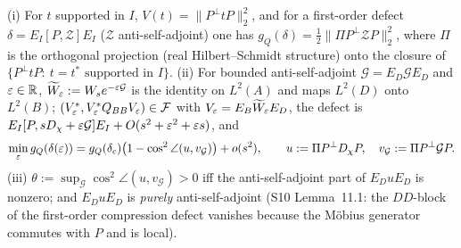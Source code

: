 \documentclass[11pt,a4paper]{article}
\begin{document}
\begin{lemma}\label{lem:orbit}
(i) For \(t\) supported in \(I\), \(V(t)=\|P^\perp tP\|_2^2\), and for a first-order defect
\(\delta=E_I[P,\mathcal Z]E_I\) (\(\mathcal Z\) anti-self-adjoint) one has
\(g_Q(\delta)=\frac12\|\Pi P^\perp\mathcal ZP\|_2^2\), where \(\Pi\) is the orthogonal projection (real
Hilbert--Schmidt structure) onto the closure of \(\{P^\perp tP:\ t=t^*\text{ supported in }I\}\).
(ii) For bounded anti-self-adjoint \(\mathcal G=E_D\mathcal GE_D\) and \(\varepsilon\in\mathbb R\),
\(\widetilde W_\varepsilon:=W_se^{-\varepsilon\mathcal G}\) is the identity on \(L^2(A)\) and maps \(L^2(D)\) onto
\(L^2(B)\); \((V_\varepsilon^*,V_\varepsilon^*Q_{BB}V_\varepsilon)\in\mathcal F\) with \(V_\varepsilon=E_B\widetilde W_\varepsilon E_D\), the
defect is \(E_I[P,sD_\chi+\varepsilon\mathcal G]E_I+O(s^2+\varepsilon^2+\varepsilon s)\), and
\[
 \min_\varepsilon g_Q(\delta(\varepsilon))=g_Q(\delta_c)\bigl(1-\cos^2\angle(u,v_{\mathcal G})\bigr)+o(s^2),\qquad
 u:=\Pi P^\perp D_\chi P,\quad v_{\mathcal G}:=\Pi P^\perp\mathcal GP .
\]
(iii) \(\theta:=\sup_{\mathcal G}\cos^2\angle(u,v_{\mathcal G})>0\) iff the anti-self-adjoint part of
\(E_DuE_D\) is nonzero; and \(E_DuE_D\) is \emph{purely} anti-self-adjoint (S10 Lemma~11.1: the
\(DD\)-block of the first-order compression defect vanishes because the M\"obius generator commutes with
\(P\) and is local).
\end{lemma}
\end{document}
